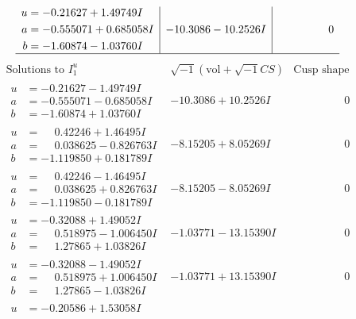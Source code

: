 \documentclass[1p]{elsarticle_modified}
\theoremstyle{definition}
\newcommand{\I}{\sqrt{-1}}
\begin{document}
$$\begin{array}{c|c|c}
\begin{aligned}
u &= -0.21627 + 1.49749 I \\
a &= -0.555071 + 0.685058 I \\
b &= -1.60874 - 1.03760 I\end{aligned}
 & -10.3086 - 10.2526 I & \phantom{-0.000000 } 0\\
 \hline 
 \end{array}$$\newpage$$\begin{array}{c|c|c}  
\text{Solutions to }I^u_{1}& \I (\text{vol} + \sqrt{-1}CS) & \text{Cusp shape}\\
 \hline 
\begin{aligned}
u &= -0.21627 - 1.49749 I \\
a &= -0.555071 - 0.685058 I \\
b &= -1.60874 + 1.03760 I\end{aligned}
 & -10.3086 + 10.2526 I & \phantom{-0.000000 } 0 \\ \hline\begin{aligned}
u &= \phantom{-}0.42246 + 1.46495 I \\
a &= \phantom{-}0.038625 - 0.826763 I \\
b &= -1.119850 + 0.181789 I\end{aligned}
 & -8.15205 + 8.05269 I & \phantom{-0.000000 } 0 \\ \hline\begin{aligned}
u &= \phantom{-}0.42246 - 1.46495 I \\
a &= \phantom{-}0.038625 + 0.826763 I \\
b &= -1.119850 - 0.181789 I\end{aligned}
 & -8.15205 - 8.05269 I & \phantom{-0.000000 } 0 \\ \hline\begin{aligned}
u &= -0.32088 + 1.49052 I \\
a &= \phantom{-}0.518975 - 1.006450 I \\
b &= \phantom{-}1.27865 + 1.03826 I\end{aligned}
 & -1.03771 - 13.15390 I & \phantom{-0.000000 } 0 \\ \hline\begin{aligned}
u &= -0.32088 - 1.49052 I \\
a &= \phantom{-}0.518975 + 1.006450 I \\
b &= \phantom{-}1.27865 - 1.03826 I\end{aligned}
 & -1.03771 + 13.15390 I & \phantom{-0.000000 } 0 \\ \hline\begin{aligned}
u &= -0.20586 + 1.53058 I \\

\end{aligned}
\end{array}$$
\end{document}
